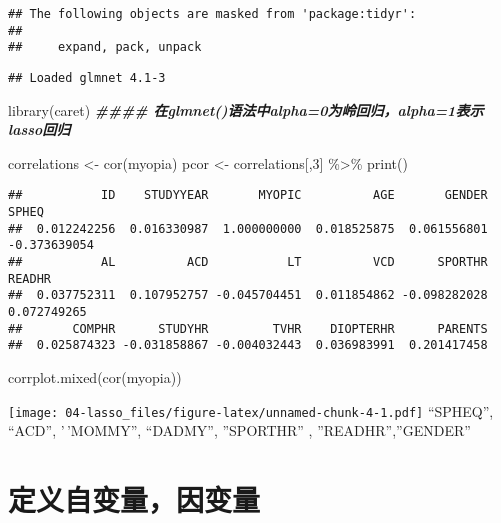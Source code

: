 \documentclass[]{ctexbook}
\newenvironment{Shaded}{\begin{snugshade}}{\end{snugshade}}
\newcommand{\DecValTok}[1]{\textcolor[rgb]{0.00,0.00,0.81}{#1}}
\newcommand{\DocumentationTok}[1]{\textcolor[rgb]{0.56,0.35,0.01}{\textbf{\textit{#1}}}}
\newcommand{\FunctionTok}[1]{\textcolor[rgb]{0.00,0.00,0.00}{#1}}
\newcommand{\NormalTok}[1]{#1}
\newcommand{\OtherTok}[1]{\textcolor[rgb]{0.56,0.35,0.01}{#1}}
\newcommand{\SpecialCharTok}[1]{\textcolor[rgb]{0.00,0.00,0.00}{#1}}
\begin{document}
\begin{verbatim}
## The following objects are masked from 'package:tidyr':
## 
##     expand, pack, unpack
\end{verbatim}

\begin{verbatim}
## Loaded glmnet 4.1-3
\end{verbatim}

\begin{Shaded}
\begin{Highlighting}[]
\FunctionTok{library}\NormalTok{(caret)}
\DocumentationTok{\#\#\#\# 在glmnet()语法中alpha=0为岭回归，alpha=1表示lasso回归}
\end{Highlighting}
\end{Shaded}

\begin{Shaded}
\begin{Highlighting}[]
\NormalTok{correlations }\OtherTok{\textless{}{-}} \FunctionTok{cor}\NormalTok{(myopia)}
\NormalTok{pcor }\OtherTok{\textless{}{-}}\NormalTok{ correlations[,}\DecValTok{3}\NormalTok{] }\SpecialCharTok{\%\textgreater{}\%}
  \FunctionTok{print}\NormalTok{()}
\end{Highlighting}
\end{Shaded}

\begin{verbatim}
##           ID    STUDYYEAR       MYOPIC          AGE       GENDER        SPHEQ 
##  0.012242256  0.016330987  1.000000000  0.018525875  0.061556801 -0.373639054 
##           AL          ACD           LT          VCD      SPORTHR       READHR 
##  0.037752311  0.107952757 -0.045704451  0.011854862 -0.098282028  0.072749265 
##       COMPHR      STUDYHR         TVHR    DIOPTERHR      PARENTS 
##  0.025874323 -0.031858867 -0.004032443  0.036983991  0.201417458
\end{verbatim}

\begin{Shaded}
\begin{Highlighting}[]
\FunctionTok{corrplot.mixed}\NormalTok{(}\FunctionTok{cor}\NormalTok{(myopia))}
\end{Highlighting}
\end{Shaded}

\texttt{[image: 04-lasso\_files/figure-latex/unnamed-chunk-4-1.pdf]}
``SPHEQ'', ``ACD'', '\,'MOMMY'', ``DADMY'', ''SPORTHR'' , ''READHR'',''GENDER''

\hypertarget{ux5b9aux4e49ux81eaux53d8ux91cfux56e0ux53d8ux91cf}{%
\section{定义自变量，因变量}\label{ux5b9aux4e49ux81eaux53d8ux91cfux56e0ux53d8ux91cf}}
\end{document}
